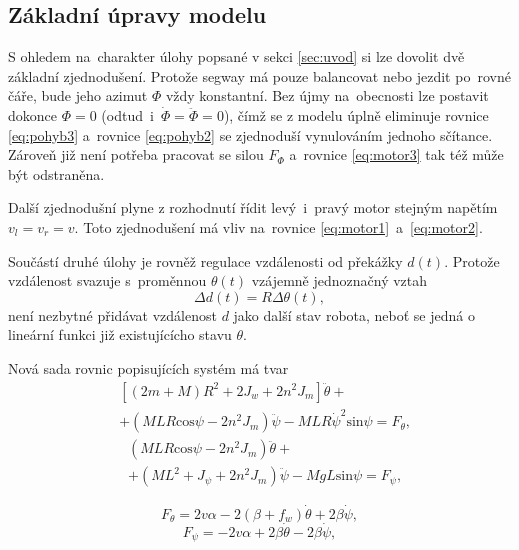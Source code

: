 \documentclass[conference]{IEEEtran}
\begin{document}
\subsection{Základní úpravy modelu}
S ohledem na~charakter úlohy popsané v sekci \ref{sec:uvod} si lze dovolit dvě základní zjednodušení. Protože segway
má pouze balancovat nebo jezdit po~rovné čáře, bude jeho azimut $\varPhi$ vždy konstantní. 
Bez újmy na~obecnosti lze postavit dokonce $\varPhi = 0$ (odtud~i~$\dot{\varPhi} = \ddot{\varPhi} = 0$),
čímž se z modelu úplně eliminuje rovnice \eqref{eq:pohyb3}
a~rovnice \eqref{eq:pohyb2} se zjednoduší vynulováním jednoho sčítance. Zároveň již není potřeba pracovat se silou $F_\varPhi$
a~rovnice \eqref{eq:motor3} tak též může být odstraněna.

Další zjednodušní plyne z rozhodnutí řídit levý~i~pravý motor stejným napětím $v_l = v_r = v$.
Toto zjednodušení má vliv na~rovnice \eqref{eq:motor1}~a~\eqref{eq:motor2}.

Součástí druhé úlohy je rovněž regulace vzdálenosti od překážky $d(t)$.
Protože vzdálenost svazuje s~proměnnou $\theta(t)$ vzájemně jednoznačný vztah
\begin{equation}
    \Delta d(t) = R \Delta\theta(t),
    \label{eq:vzdalenost}
\end{equation}
není nezbytné přidávat vzdálenost $d$ jako další stav robota, neboť se jedná o lineární funkci již existujícícho stavu $\theta$.

Nová sada rovnic popisujících systém má tvar
\begin{equation}
    \begin{aligned}
        &\left[(2m + M) R^2 + 2 J_w + 2n^2 J_m\right] \ddot{\theta} + \\
        &+ (MLR \text{cos} \psi - 2n^2 J_m) \ddot{\psi} - MLR\dot{\psi}^2 \text{sin} \psi = F_\theta,
    \end{aligned}
    \label{eq:pohyb1_easy}
\end{equation}
\begin{equation}
    \begin{aligned}
        & (MLR \text{cos} \psi - 2n^2 J_m) \ddot{\theta} + \\
        & + (ML^2 + J_\psi + 2n^2 J_m) \ddot{\psi} - MgL\text{sin}\psi = F_\psi,
    \end{aligned}
    \label{eq:pohyb2_easy}
\end{equation}

\begin{equation}
    F_\theta = 2v \alpha - 2(\beta + f_w) \dot{\theta} + 2\beta\dot{\psi},
    \label{eq:motor1_easy}
\end{equation}
\begin{equation}
    F_\psi = - 2v \alpha + 2\beta \dot{\theta} - 2\beta \dot{\psi},
    \label{eq:motor2_easy}
\end{equation}
\end{document}
